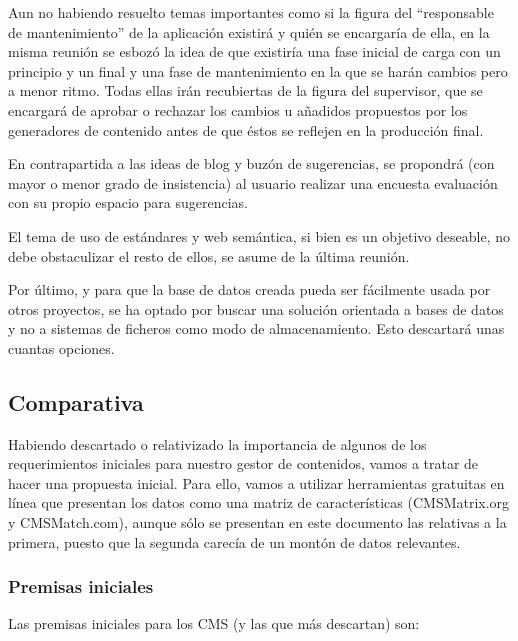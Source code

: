 \par Aun no habiendo resuelto temas importantes como si la figura del ``responsable de mantenimiento'' de la aplicación existirá y quién se encargaría de ella, en la misma reunión se esbozó la idea de que existiría una fase inicial de carga con un principio y un final y una fase de mantenimiento en la que se harán cambios pero a menor ritmo. Todas ellas irán recubiertas de la figura del supervisor, que se encargará de aprobar o rechazar los cambios u añadidos propuestos por los generadores de contenido antes de que éstos se reflejen en la producción final.

\par En contrapartida a las ideas de blog y buzón de sugerencias, se propondrá (con mayor o menor grado de insistencia) al usuario realizar una encuesta evaluación con su propio espacio para sugerencias.

\par El tema de uso de estándares y web semántica, si bien es un objetivo deseable, no debe obstaculizar el resto de ellos, se asume de la última reunión.

\par Por último, y para que la base de datos creada pueda ser fácilmente usada por otros proyectos, se ha optado por buscar una solución orientada a bases de datos y no a sistemas de ficheros como modo de almacenamiento. Esto descartará unas cuantas opciones.

\subsection{Comparativa}

\par Habiendo descartado o relativizado la importancia de algunos de los requerimientos iniciales para nuestro gestor de contenidos, vamos a tratar de hacer una propuesta inicial. Para ello, vamos a utilizar herramientas gratuitas en línea que presentan los datos como una matriz de características (CMSMatrix.org y CMSMatch.com), aunque sólo se presentan en este documento las relativas a la primera, puesto que la segunda carecía de un montón de datos relevantes.

\subsubsection{Premisas iniciales}
\par Las premisas iniciales para los CMS (y las que más descartan) son:

